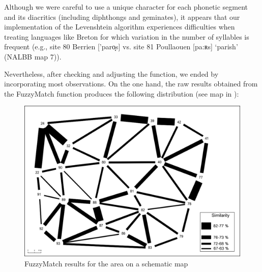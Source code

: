 \documentclass[output=paper]{LSP/langsci}
\begin{document}
\begin{table}
\caption{Examples of the difficulties encountered by LD for the concept 'that one (masc.)'}
\label{tab:3}
\end{table}

Although we were careful to use a unique character for each phonetic segment and its diacritics (including diphthongs and geminates), it appears that our implementation of the Levenshtein algorithm experiences difficulties when treating languages like Breton for which variation in the number of syllables is frequent (e.g., site 80 Berrien ['paro̝s] vs. site 81 Poullaouen [pa:ʀs] ‘parish’ (NALBB map 7)).

Nevertheless, after checking and adjusting the function, we ended by incorporating most observations. On the one hand, the raw results obtained from the FuzzyMatch function produces the following distribution (see map in ):

\begin{figure}
\includegraphics[width=\textwidth]{illustrations/brun_etal_fig3}
\caption{\textup{FuzzyMatch results for the area on a schematic map}}
\label{fig:3}
\end{figure}
\end{document}
